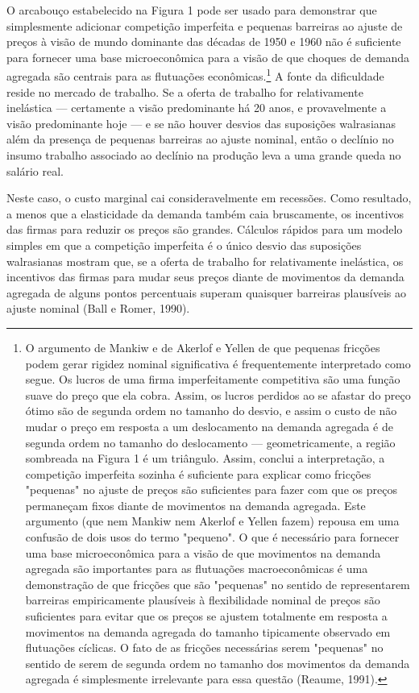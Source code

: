 \documentclass[12pt]{article}
\begin{document}
O arcabouço estabelecido na Figura 1 pode ser usado para demonstrar que simplesmente adicionar competição imperfeita e pequenas barreiras ao ajuste de preços à visão de mundo dominante das décadas de 1950 e 1960 não é suficiente para fornecer uma base microeconômica para a visão de que choques de demanda agregada são centrais para as flutuações econômicas.\footnote{O argumento de Mankiw e de Akerlof e Yellen de que pequenas fricções podem gerar rigidez nominal significativa é frequentemente interpretado como segue. Os lucros de uma firma imperfeitamente competitiva são uma função suave do preço que ela cobra. Assim, os lucros perdidos ao se afastar do preço ótimo são de segunda ordem no tamanho do desvio, e assim o custo de não mudar o preço em resposta a um deslocamento na demanda agregada é de segunda ordem no tamanho do deslocamento — geometricamente, a região sombreada na Figura 1 é um triângulo. Assim, conclui a interpretação, a competição imperfeita sozinha é suficiente para explicar como fricções "pequenas" no ajuste de preços são suficientes para fazer com que os preços permaneçam fixos diante de movimentos na demanda agregada. Este argumento (que nem Mankiw nem Akerlof e Yellen fazem) repousa em uma confusão de dois usos do termo "pequeno". O que é necessário para fornecer uma base microeconômica para a visão de que movimentos na demanda agregada são importantes para as flutuações macroeconômicas é uma demonstração de que fricções que são "pequenas" no sentido de representarem barreiras empiricamente plausíveis à flexibilidade nominal de preços são suficientes para evitar que os preços se ajustem totalmente em resposta a movimentos na demanda agregada do tamanho tipicamente observado em flutuações cíclicas. O fato de as fricções necessárias serem "pequenas" no sentido de serem de segunda ordem no tamanho dos movimentos da demanda agregada é simplesmente irrelevante para essa questão (Reaume, 1991).} A fonte da dificuldade reside no mercado de trabalho. Se a oferta de trabalho for relativamente inelástica — certamente a visão predominante há 20 anos, e provavelmente a visão predominante hoje — e se não houver desvios das suposições walrasianas além da presença de pequenas barreiras ao ajuste nominal, então o declínio no insumo trabalho associado ao declínio na produção leva a uma grande queda no salário real.

Neste caso, o custo marginal cai consideravelmente em recessões. Como resultado, a menos que a elasticidade da demanda também caia bruscamente, os incentivos das firmas para reduzir os preços são grandes. Cálculos rápidos para um modelo simples em que a competição imperfeita é o único desvio das suposições walrasianas mostram que, se a oferta de trabalho for relativamente inelástica, os incentivos das firmas para mudar seus preços diante de movimentos da demanda agregada de alguns pontos percentuais superam quaisquer barreiras plausíveis ao ajuste nominal (Ball e Romer, 1990).
\end{document}
